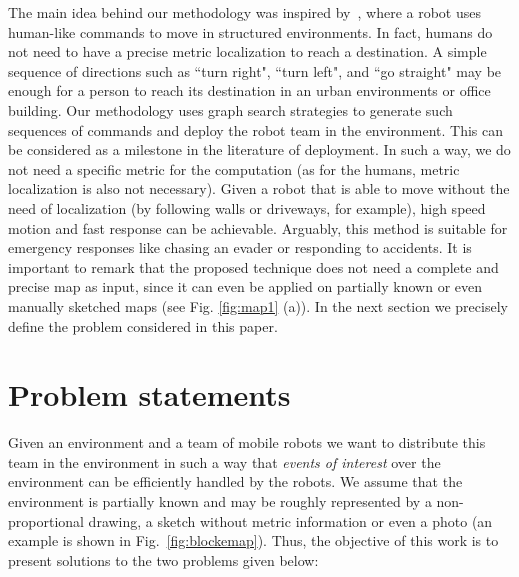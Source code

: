 \documentclass[smallcondensed]{svjour3}
\begin{document}
%
The main idea behind our methodology was inspired by~\cite{Arthur2015}, where a robot uses human-like commands to move in structured environments. In fact, humans do not need to have a precise metric localization to reach a destination. A simple sequence of directions such as ``turn right", ``turn left", and ``go straight" may be enough for a person to reach its destination in an urban environments or office building. Our methodology uses graph search strategies to generate such sequences of commands and deploy the robot team in the environment. 
%
This can be considered as a milestone in the literature of deployment. In such a way, we do not need a specific metric for the computation (as for the humans, metric localization is also not necessary). Given a robot that is able to move without the need of localization (by following walls or driveways, for example), high speed motion and fast response can be achievable. Arguably, this method is suitable for emergency responses like chasing an evader or responding to accidents. It is important to remark that the proposed technique does not need a complete and precise map as input, since it can even be applied on partially known or even manually sketched maps (see Fig. \ref{fig:map1} (a)). 
In the next section we precisely define the problem considered in this paper.  

%
\section{Problem statements}
\label{sec:probstate}

Given an environment and a team of mobile robots we want to distribute this team in the environment in such a way that \textit{events of interest} over the environment can be efficiently handled by the robots. We assume that the environment is partially known and may be roughly represented by a non-proportional drawing, a sketch without metric information or even a photo (an example is shown in Fig.~\ref{fig:blockemap}). %
Thus, the objective of this work is to present solutions to the two problems given below:
\end{document}
